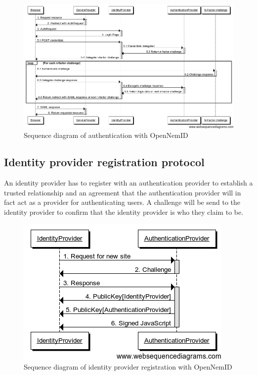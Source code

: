 \documentclass[twosided]{report}
\begin{document}
\begin{figure}[H]
	\centering
	\includegraphics[scale=0.4]{images/Open-NemId-(User-Login).png}
	\caption{Sequence diagram of authentication with OpenNemID}
\end{figure}

\subsection{Identity provider registration protocol}
An identity provider has to register with an authentication provider to establish a trusted relationship and an agreement that the authentication provider will in fact act as a provider for authenticating users. A challenge will be send to the identity provider to confirm that the identity provider is who they claim to be.

\begin{figure}[H]
	\centering
	\includegraphics[scale=0.6]{images/Open-NemId-(IdentityProvider-Registration).png}
	\caption{Sequence diagram of identity provider registration with OpenNemID}
\end{figure}
\end{document}
